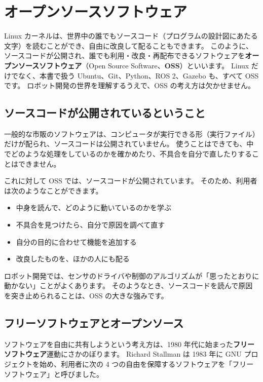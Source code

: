 \section{オープンソースソフトウェア}
\label{sec:linux-oss}

Linux カーネルは、世界中の誰でもソースコード（プログラムの設計図にあたる文字）を読むことができ、自由に改良して配ることもできます。
このように、ソースコードが公開され、誰でも利用・改良・再配布できるソフトウェアを\textbf{オープンソースソフトウェア}（Open Source Software、\textbf{OSS}）といいます。
Linux だけでなく、本書で扱う Ubuntu、Git、Python、ROS 2、Gazebo も、すべて OSS です。
ロボット開発の世界を理解するうえで、OSS の考え方は欠かせません。

\subsection{ソースコードが公開されているということ}

一般的な市販のソフトウェアは、コンピュータが実行できる形（実行ファイル）だけが配られ、ソースコードは公開されていません。
使うことはできても、中でどのような処理をしているのかを確かめたり、不具合を自分で直したりすることはできません。

これに対して OSS では、ソースコードが公開されています。
そのため、利用者は次のようなことができます。

\begin{itemize}
  \item 中身を読んで、どのように動いているのかを学ぶ
  \item 不具合を見つけたら、自分で原因を調べて直す
  \item 自分の目的に合わせて機能を追加する
  \item 改良したものを、ほかの人にも配る
\end{itemize}

ロボット開発では、センサのドライバや制御のアルゴリズムが「思ったとおりに動かない」ことがよくあります。
そのようなとき、ソースコードを読んで原因を突き止められることは、OSS の大きな強みです。

\subsection{フリーソフトウェアとオープンソース}

ソフトウェアを自由に共有しようという考え方は、1980 年代に始まった\textbf{フリーソフトウェア}運動にさかのぼります。
Richard Stallman は 1983 年に GNU プロジェクトを始め、利用者に次の 4 つの自由を保障するソフトウェアを「フリーソフトウェア」と呼びました。

